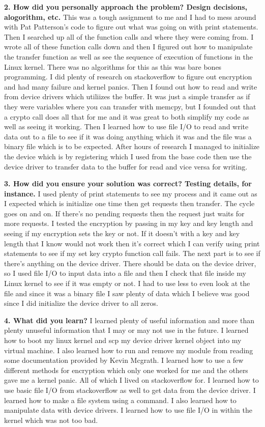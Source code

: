 \documentclass[draftclsnofoot,onecolumn,letterpaper,10pt,titlepage]{IEEEtran}
\begin{document}
    \textbf{2. How did you personally approach the problem? Design decisions, alogorithm, etc.}
	This was a tough assignment to me and I had to mess around with Pat Patterson's code to figure out what was going on with print statements. Then I searched up all of the function calls and where they were coming from. I wrote all of these function calls down and then I figured out how to manipulate the transfer function as well as see the sequence of execution of functions in the Linux kernel. There was no algorithms for this as this was bare bones programming. I did plenty of research on stackoverflow to figure out encryption and had many failure and kernel panics. Then I found out how to read and write from device drivers which utiliizes the buffer. It was just a simple transfer as if they were variables where you can transfer with memcpy, but I founded out that a crypto call does all that for me and it was great to both simplify my code as well as seeing it working. Then I learned how to use file I/O to read and write data out to a file to see if it was doing anything which it was and the file was a binary file which is to be expected. After hours of research I managed to initialize the device which is by registering which I used from the base code then use the device driver to transfer data to the buffer for read and vice versa for writing.

    \textbf{3. How did you ensure your solution was correct? Testing details, for instance.}
    I used plenty of print statements to see my process and it came out as I expected which is initialize one time then get requests then transfer. The cycle goes on and on. If there's no pending requests then the request just waits for more requests. I tested the encryption by passing in my key and key length and seeing if my encryption sets the key or not. If it doesn't with a key and key length that I know would not work then it's correct which I can verify using print statements to see if my set key crypto function call fails. The next part is to see if there's anything on the device driver. There should be data on the device driver, so I used file I/O to input data into a file and then I check that file inside my Linux kernel to see if it was empty or not. I had to use less to even look at the file and since it was a binary file I saw plenty of data which I believe was good since I did initialize the device driver to all zeros.

    \textbf{4. What did you learn?}
	I learned plenty of useful information and more than plenty unuseful information that I may or may not use in the future. I learned how to boot my linux kernel and scp my device driver kernel object into my virtual machine. I also learned how to run and remove my module from reading some documentation provided by Kevin Mcgrath. I learned how to use a few different methods for encryption which only one worked for me and the others gave me a kernel panic. All of which I lived on stackoverflow for. I learned how to use basic file I/O from stackoverflow as well to get data from the device driver. I learned how to make a file system using a command. I also learned how to manipulate data with device drivers. I learned how to use file I/O in within the kernel which was not too bad.
\end{document}
